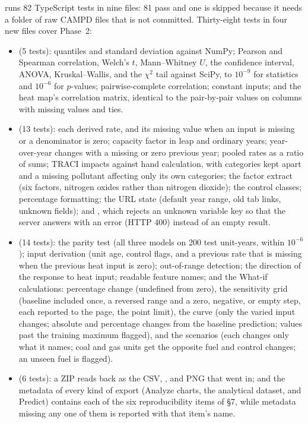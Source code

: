 \documentclass[11pt,a4paper]{article}
\begin{document}
 runs 82 TypeScript tests in nine files: 81 pass and one is skipped because it
needs a folder of raw CAMPD files that is not committed. Thirty-eight tests in four new files
cover Phase~2:
\begin{itemize}
  \item {} (5 tests): quantiles and standard deviation against NumPy; Pearson
        and Spearman correlation, Welch's $t$, Mann--Whitney $U$, the confidence interval,
        ANOVA, Kruskal--Wallis, and the $\chi^2$ tail against SciPy, to $10^{-9}$ for statistics
        and $10^{-6}$ for $p$-values; pairwise-complete correlation; constant inputs; and the
        heat map's correlation matrix, identical to the pair-by-pair values on columns with
        missing values and ties.
  \item {} (13 tests): each derived rate, and its missing value when an input
        is missing or a denominator is zero; capacity factor in leap and ordinary years;
        year-over-year changes with a missing or zero previous year; pooled rates as a ratio of
        sums; TRACI impacts against hand calculation, with categories kept apart and a missing
        pollutant affecting only its own categories; the factor extract (six factors, nitrogen
        oxides rather than nitrogen dioxide); the control classes; percentage formatting; the URL
        state (default year range, old tab links, unknown fields); and , which
        rejects an unknown variable key so that the server answers with an error (HTTP 400)
        instead of an empty result.
  \item {} (14 tests): the parity test (all three models on 200 test
        unit-years, within $10^{-6}$); input derivation (unit age, control flags, and a previous
        rate that is missing when the previous heat input is zero); out-of-range detection; the
        direction of the response to heat input; readable feature names; and the What-if
        calculations: percentage change (undefined from zero), the sensitivity grid (baseline
        included once, a reversed range and a zero, negative, or empty step, each reported to the
        page, the point limit), the curve (only the
        varied input changes; absolute and percentage changes from the baseline prediction;
        values past the training maximum flagged), and the scenarios (each changes only what it
        names; coal and gas units get the opposite fuel and control changes; an unseen fuel is
        flagged).
  \item {} (6 tests): a ZIP reads back as the CSV, ,
        and PNG that went in; and the metadata of every kind of export (Analyze charts, the
        analytical dataset, and Predict) contains each of the six reproducibility items of
        \S7, while metadata missing any one of them is reported with that item's name.
\end{itemize}
\end{document}
